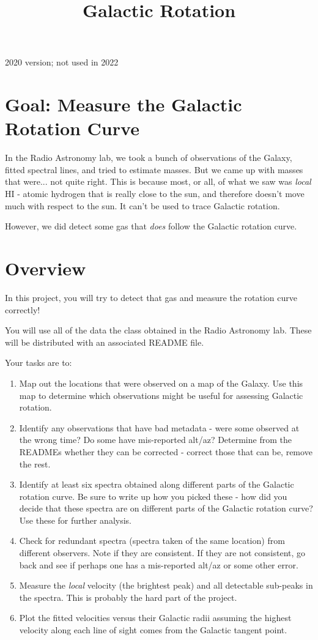 \documentclass[11pt]{article}
\begin{document}
\title{Galactic Rotation}
2020 version; not used in 2022

\section{Goal: Measure the Galactic Rotation Curve}
In the Radio Astronomy lab, we took a bunch of observations of the Galaxy, fitted spectral lines, and tried to estimate masses.  But we came up with masses that were... not quite right.
This is because most, or all, of what we saw was \emph{local} HI - atomic hydrogen that is really close to the sun, and therefore doesn't move much with respect to the sun.  It can't be used
to trace Galactic rotation.

However, we did detect some gas that \emph{does} follow the Galactic rotation curve.

\section{Overview}
In this project, you will try to detect that gas and measure the rotation curve correctly!

You will use all of the data the class obtained in the Radio Astronomy lab.
These will be distributed with an associated README file.

Your tasks are to:

\begin{enumerate}
    \item Map out the locations that were observed on a map of the Galaxy.  Use
        this map to determine which observations might be useful for assessing
        Galactic rotation.
    \item Identify any observations that have bad metadata - were some observed
        at the wrong time?  Do some have mis-reported alt/az?  Determine from
        the READMEs whether they can be corrected - correct those that can be,
        remove the rest.
    \item Identify at least six spectra obtained along different parts of the
        Galactic rotation curve.  Be sure to write up how you picked these -
        how did you decide that these spectra are on different parts of the
        Galactic rotation curve?  Use these for further analysis.
    \item Check for redundant spectra (spectra taken of the same location) from
        different observers.  Note if they are consistent.  If they are not consistent,
        go back and see if perhaps one has a mis-reported alt/az or some other error.
    \item Measure the \emph{local} velocity (the brightest peak) and all
        detectable sub-peaks in the spectra.
        This is probably the hard part of the project.
    \item Plot the fitted velocities versus their Galactic radii assuming the
        highest velocity along each line of sight comes from the Galactic
        tangent point.
\end{enumerate}
\end{document}
